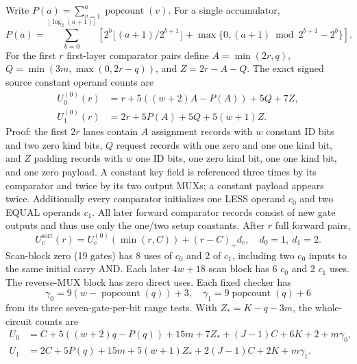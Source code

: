 \documentclass[11pt]{article}
\begin{document}
Write \(P(a)=\sum_{v=1}^a\operatorname{popcount}(v)\).
For a single accumulator,
\[
P(a)=\sum_{b=0}^{\lfloor\log_2(a+1)\rfloor}
\left[2^b\lfloor(a+1)/2^{b+1}\rfloor+
\max\{0,(a+1)\bmod2^{b+1}-2^b\}\right].
\]
For the first \(r\) first-layer comparator pairs define
\(A=\min(2r,q)\), \(Q=\min(3m,\max(0,2r-q))\),
and \(Z=2r-A-Q\).
The exact signed source constant operand counts are
\begin{align*}
U^{(0)}_0(r)&=r+5((w+2)A-P(A))+5Q+7Z,\\
U^{(0)}_1(r)&=2r+5P(A)+5Q+5(w+1)Z .
\end{align*}
Proof: the first \(2r\) lanes contain \(A\) assignment
records with \(w\) constant ID bits and two zero kind
bits, \(Q\) request records with one zero and one one
kind bit, and \(Z\) padding records with \(w\) one ID
bits, one zero kind bit, one one kind bit, and one zero
payload. A constant key field is referenced three times
by its comparator and twice by its two output MUXs;
a constant payload appears twice. Additionally every
comparator initializes one LESS operand \(c_0\) and
two EQUAL operands \(c_1\).
All later forward comparator records consist of
new gate outputs and thus use only the one/two
setup constants. After \(r\) full forward pairs,
\[
U^{\mathrm{sort}}_c(r)=
U^{(0)}_c(\min(r,C))+(r-C)_+d_c,\quad
d_0=1,\ d_1=2.
\]
Scan-block zero (19 gates) has 8 uses of \(c_0\)
and 2 of \(c_1\), including two \(c_0\) inputs to
the same initial carry AND. Each later \(4w+18\)
scan block has 6 \(c_0\) and 2 \(c_1\) uses.
The reverse-MUX block has zero direct uses.
Each fixed checker has
\[
\gamma_0=9(w-\operatorname{popcount}(q))+3,\quad
\gamma_1=9\operatorname{popcount}(q)+6
\]
from its three seven-gate-per-bit range tests.
With \(Z_*=K-q-3m\), the whole-circuit counts are
\begin{align*}
U_0&=C+5((w+2)q-P(q))+15m+7Z_*+(J-1)C
      +6K+2+m\gamma_0,\\
U_1&=2C+5P(q)+15m+5(w+1)Z_*+2(J-1)C
      +2K+m\gamma_1.
\end{align*}
\end{document}
